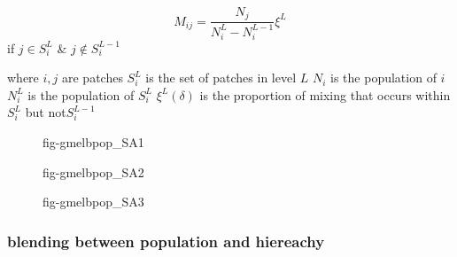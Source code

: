 \documentclass[
  letterpaper,
  DIV=11,
  numbers=noendperiod]{scrartcl}
\begin{document}
\[M_{ij} = \frac{N_{j}}{N_{i}^{L} - N_{i}^{L-1}} \xi^{L}\] if
\(j \in S_{i}^{L}\) \& \(j \notin S_{i}^{L-1}\)

where \(i, j\) are patches \(S_{i}^{L}\) is the set of patches in level
\(L\) \(N_i\) is the population of \(i\) \(N_{i}^{L}\) is the population
of \(S_{i}^{L}\) \(\xi^{L}(\delta)\) is the proportion of mixing that
occurs within \(S_{i}^{L}\) but not\(S_{i}^{L-1}\)

\begin{figure}

\begin{minipage}[t]{0.50\linewidth}

{\centering 


\caption{\label{fig-gmelbpop-1}fig-gmelbpop\_SA1}

}

\end{minipage}%
%
\begin{minipage}[t]{0.50\linewidth}

{\centering 


\caption{\label{fig-gmelbpop-2}fig-gmelbpop\_SA2}

}

\end{minipage}%
\newline
\begin{minipage}[t]{0.50\linewidth}

{\centering 


\caption{\label{fig-gmelbpop-3}fig-gmelbpop\_SA3}

}

\end{minipage}%

\end{figure}

\hypertarget{blending-between-population-and-hiereachy}{%
\subsubsection{blending between population and
hiereachy}\label{blending-between-population-and-hiereachy}}
\end{document}
